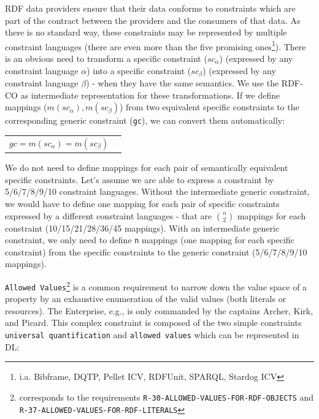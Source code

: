 \documentclass{llncs}
\newcommand{\ms}[1]{\texttt{#1}}
\newenvironment{DL}{
  \vspace{0cm}
	\begin{center}
  \begin{tabular}{r l}

}{
  \end{tabular}
	\end{center}
}
\begin{document}
RDF data providers ensure that their data conforms to constraints which are part of the contract between the providers and the consumers of that data.
As there is no standard way, these constraints may be represented by multiple constraint languages (there are even more than the five promising ones\footnote{i.a. Bibframe, DQTP, Pellet ICV, RDFUnit, SPARQL, Stardog ICV}).
There is an obvious need to transform a specific constraint (\ms{$sc_{\alpha}$}) (expressed by any constraint language \ms{$\alpha$}) into a specific constraint (\ms{$sc_{\beta}$}) (expressed by any constraint language \ms{$\beta$}) - when they have the same semantics.
We use the RDF-CO as intermediate representation for these transformations.
If we define mappings ($m(sc_{\alpha}), m(sc_{\beta})$) from two equivalent specific constraints to the corresponding generic constraint (\ms{gc}),
we can convert them automatically:

\begin{DL}
$ gc = m(sc_{\alpha}) = m(sc_{\beta}) $
\end{DL}

We do not need to define mappings for each pair of semantically equivalent specific constraints.
Let's assume we are able to express a constraint by 5/6/7/8/9/10 constraint languages.
Without the intermediate generic constraint, we would have to define one mapping for each pair of specific constraints expressed by a different constraint languages
- that are \ms{\( {n \choose 2} \)} mappings for each constraint (10/15/21/28/36/45 mappings).
With an intermediate generic constraint, we only need to define \ms{n} mappings (one mapping for each specific constraint) from the specific constraints to the generic constraint (5/6/7/8/9/10 mappings).



\ms{Allowed Values}\footnote{corresponds to the requirements \ms{R-30-ALLOWED-VALUES-FOR-RDF-OBJECTS} and \ms{R-37-ALLOWED-VALUES-FOR-RDF-LITERALS}}
is a common requirement to narrow down the value space of a property by an exhaustive enumeration of the valid values (both literals or resources). 
The Enterprise, e.g., is only commanded by the captains Archer, Kirk, and Picard.
This complex constraint is composed of the two simple constraints \ms{universal quantification} and \ms{allowed values} which can be represented in DL:
\end{document}
